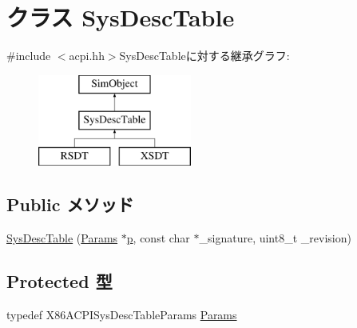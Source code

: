 \hypertarget{classX86ISA_1_1ACPI_1_1SysDescTable}{
\section{クラス SysDescTable}
\label{classX86ISA_1_1ACPI_1_1SysDescTable}
}


{\ttfamily \#include $<$acpi.hh$>$}SysDescTableに対する継承グラフ:\begin{figure}[H]
\begin{center}
\leavevmode
\includegraphics[height=3cm]{classX86ISA_1_1ACPI_1_1SysDescTable}
\end{center}
\end{figure}
\subsection*{Public メソッド}
\begin{DoxyCompactItemize}
\item 
\hyperlink{classX86ISA_1_1ACPI_1_1SysDescTable_a04eab68a8eb0bb71949b6e65354a1f0c}{SysDescTable} (\hyperlink{classX86ISA_1_1ACPI_1_1SysDescTable_ad7d44b54d0c12bc9cfd0eea8156c47ba}{Params} $\ast$\hyperlink{namespaceX86ISA_af675c1d542a25b96e11164b80809a856}{p}, const char $\ast$\_\-signature, uint8\_\-t \_\-revision)
\end{DoxyCompactItemize}
\subsection*{Protected 型}
\begin{DoxyCompactItemize}
\item 
typedef X86ACPISysDescTableParams \hyperlink{classX86ISA_1_1ACPI_1_1SysDescTable_ad7d44b54d0c12bc9cfd0eea8156c47ba}{Params}
\end{DoxyCompactItemize}
